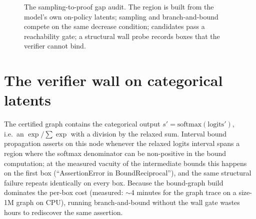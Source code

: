 \documentclass[11pt]{article}
\newcommand{\stoch}{s}
\begin{document}
\begin{figure}[t]
\centering
{}
\caption{The sampling-to-proof gap audit. The region is built from the
model's own on-policy latents; sampling and branch-and-bound compete on the
same decrease condition; candidates pass a reachability gate; a structural
wall probe records boxes that the verifier cannot bind.}
\label{fig:pipeline}
\end{figure}

\section{The verifier wall on categorical latents}

The certified graph contains the categorical output
$\stoch' = \mathrm{softmax}(\mathrm{logits}')$, i.e.\ an
$\exp/\sum\exp$ with a division by the relaxed sum. Interval bound
propagation asserts on this node whenever the relaxed logits interval spans a
region where the softmax denominator can be non-positive in the bound
computation; at the measured vacuity of the intermediate bounds this happens
on the first box (``AssertionError in BoundReciprocal''), and the same
structural failure repeats identically on every box. Because the bound-graph
build dominates the per-box cost (measured: $\sim$4 minutes for the graph
trace on a size-1M graph on CPU), running branch-and-bound without the wall
gate wastes hours to rediscover the same assertion.
\end{document}
